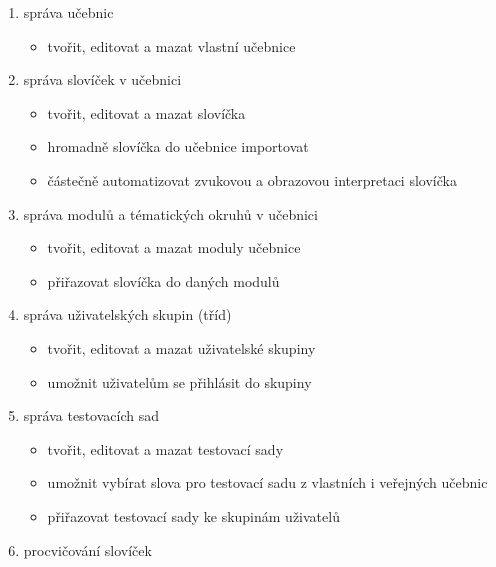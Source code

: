 \documentclass[a4paper,11pt,titlepage,fleqn]{article}
\begin{document}
        \begin{enumerate}
            \item správa učebnic
                \begin{itemize}
                    \item tvořit, editovat a mazat vlastní učebnice
                \end{itemize} 
            \item správa slovíček v učebnici
                \begin{itemize}
                    \item tvořit, editovat a mazat slovíčka
                    \item hromadně slovíčka do učebnice importovat
                    \item částečně automatizovat zvukovou a obrazovou interpretaci slovíčka
                \end{itemize} 
            \item správa modulů a tématických okruhů v učebnici
                \begin{itemize}
                    \item tvořit, editovat a mazat moduly učebnice
                    \item přiřazovat slovíčka do daných modulů
                \end{itemize}
            \item správa uživatelských skupin (tříd)
                \begin{itemize}
                    \item tvořit, editovat a mazat uživatelské skupiny
                    \item umožnit uživatelům se přihlásit do skupiny
                \end{itemize}
            \item správa testovacích sad
                \begin{itemize}
                    \item tvořit, editovat a mazat testovací sady
                    \item umožnit vybírat slova pro testovací sadu z vlastních i veřejných učebnic
                    \item přiřazovat testovací sady ke skupinám uživatelů
                \end{itemize}
            \item procvičování slovíček
                \begin{itemize}

\end{itemize}
\end{enumerate}
\end{document}
